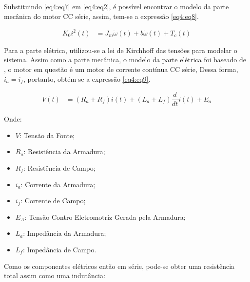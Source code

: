 Substituindo \ref{eq4:eq7} em \ref{eq4:eq2}, é possível encontrar o modelo da parte mecânica do motor CC série, assim, tem-se a expressão  \ref{eq4:eq8}.


\begin{align}
	K_0 i^2(t) &= J_m\ddot{\omega}(t) + b\dot{\omega}(t) + T_c(t) \label{eq4:eq8}
\end{align}




Para a parte elétrica, utilizou-se a lei de Kirchhoff das tensões para modelar o sistema. Assim como a parte mecânica, o modelo da parte elétrica foi baseado de \cite{jesus}, o motor em questão é um motor de corrente contínua CC série, Dessa forma, $i_a = i_f$, portanto, obtém-se a expressão \ref{eq4:eq9}.


\begin{align}
	V(t) &= (R_a + R_f)i(t)+ (L_a + L_f)\dfrac{d}{dt}i(t) + E_a \label{eq4:eq9}
\end{align}

\noindent Onde:

\begin{itemize}
        \setlength{\itemsep}{-2pt}
	\item $V$: Tensão da Fonte;
	\item $R_a$: Resistência da Armadura;
	\item $R_f$: Resistência de Campo;
	\item $i_a$: Corrente da Armadura;
	\item $i_f$: Corrente de Campo;
	\item $E_A$: Tensão Contro Eletromotriz Gerada pela Armadura;
	\item $L_a$: Impedância da Armadura;
	\item $L_f$: Impedância de Campo.
\end{itemize}

Como os componentes elétricos então em série, pode-se obter uma resistência total assim como uma indutância:

